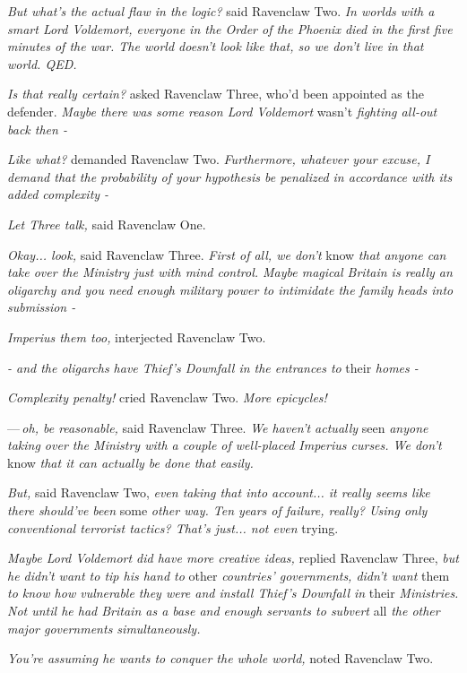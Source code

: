 \emph{But what's the actual flaw in the logic?} said Ravenclaw Two. \emph{In worlds with a smart Lord Voldemort, everyone in the Order of the Phoenix died in the first five minutes of the war. The world doesn't look like that, so we don't live in that world. QED.}

\emph{Is that really certain?} asked Ravenclaw Three, who'd been appointed as the defender. \emph{Maybe there was some reason Lord Voldemort} wasn't \emph{fighting all-out back then -}

\emph{Like what?} demanded Ravenclaw Two. \emph{Furthermore, whatever your excuse, I demand that the probability of your hypothesis be penalized in accordance with its added complexity -}

\emph{Let Three talk,} said Ravenclaw One.

\emph{Okay... look,} said Ravenclaw Three. \emph{First of all, we don't} know \emph{that anyone can take over the Ministry just with mind control. Maybe magical Britain is really an oligarchy and you need enough military power to intimidate the family heads into submission -}

\emph{Imperius them too,} interjected Ravenclaw Two.

\emph{- and the oligarchs have Thief's Downfall in the entrances to} their \emph{homes -}

\emph{Complexity penalty!} cried Ravenclaw Two. \emph{More epicycles!}

---\,\emph{oh, be reasonable,} said Ravenclaw Three. \emph{We haven't actually} seen \emph{anyone taking over the Ministry with a couple of well-placed Imperius curses. We don't} know \emph{that it can actually be done that easily.}

\emph{But,} said Ravenclaw Two, \emph{even taking that into account... it really seems like there should've been} some \emph{other way. Ten years of failure, really? Using only conventional terrorist tactics? That's just... not even} trying.

\emph{Maybe Lord Voldemort did have more creative ideas,} replied Ravenclaw Three, \emph{but he didn't want to tip his hand to} other \emph{countries' governments, didn't want} them \emph{to know how vulnerable they were and install Thief's Downfall in} their \emph{Ministries. Not until he had Britain as a base and enough servants to subvert} all \emph{the other major governments simultaneously.}

\emph{You're assuming he wants to conquer the whole world,} noted Ravenclaw Two.

